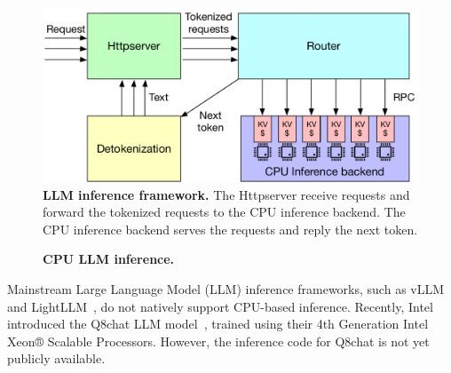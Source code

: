 \begin{figure}[t]
\centering
 \includegraphics[width=0.6\columnwidth]{fig/cxl/llm.pdf}
  \caption[LLM inference framework]{\textbf{LLM inference framework.} The Httpserver receive requests and forward the tokenized requests to the CPU inference backend. The CPU inference backend serves the requests and reply the next token.}
\label{fig:llm-framework}
\end{figure}

\begin{figure}[h!]
\centering
{}
\caption[CPU LLM inference]{\textbf{CPU LLM inference.} }
\end{figure}
Mainstream Large Language Model (LLM) inference frameworks, such as vLLM~\cite{vllm} and LightLLM~\cite{lightllm}, do not natively support CPU-based inference. Recently, Intel introduced the Q8chat LLM model~\cite{q8chat}, trained using their 4th Generation Intel Xeon® Scalable Processors. However, the inference code for Q8chat is not yet publicly available. 

